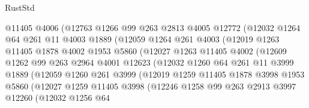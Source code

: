 \begin{lexlean}{RustStd}
\begin{coremodule}
{\begin{coremodule}
{{{{{{{{{{{{{{{{{{{{{{{{{{{{{                    @11405
                    @4006
                    (@12763
                      @1266
                      @99
                      @263
                      @2813
                      @4005
                      @12772
                      (@12032
                        @1264
                        @64
                        @261
                        @11
                        @4003
                        @1889
                        (@12059
                          @1264
                          @261
                          @4003
                          (@12019
                            @1263
                            @11405
                            @1878
                            @4002
                            @1953
                            @5860
                            (@12027
                              @1263
                              @11405
                              @4002
                              (@12609
                                @1262
                                @99
                                @263
                                @2964
                                @4001
                                @12623
                                (@12032
                                  @1260
                                  @64
                                  @261
                                  @11
                                  @3999
                                  @1889
                                  (@12059
                                    @1260
                                    @261
                                    @3999
                                    (@12019
                                      @1259
                                      @11405
                                      @1878
                                      @3998
                                      @1953
                                      @5860
                                      (@12027
                                        @1259
                                        @11405
                                        @3998
                                        (@12246
                                          @1258
                                          @99
                                          @263
                                          @2913
                                          @3997
                                          @12260
                                          (@12032
                                            @1256
                                            @64
}}}}}}}}}}}}}}}}}}}}}}}}}}}}}
\end{coremodule}}
\end{coremodule}
\end{lexlean}
